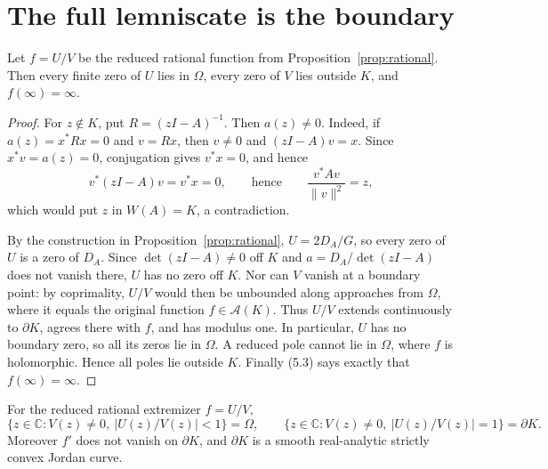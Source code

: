 \documentclass[preprints,article,submit,oneauthor]{Definitions/mdpi}
\numberwithin{equation}{section}
\newcommand{\C}{\mathbb C}
\begin{document}
\section{The full lemniscate is the boundary}

\begin{Lemma}\label{lem:zeros}
Let \(f=U/V\) be the reduced rational function from
Proposition~\ref{prop:rational}.  Then every finite zero of \(U\) lies in
\(\Omega\), every zero of \(V\) lies outside \(K\), and \(f(\infty)=\infty\).
\end{Lemma}

\begin{proof}
For \(z\notin K\), put \(R=(zI-A)^{-1}\).  Then \(a(z)\neq0\).
Indeed, if \(a(z)=x^*Rx=0\) and \(v=Rx\), then \(v\neq0\) and
\((zI-A)v=x\).  Since \(x^*v=a(z)=0\), conjugation gives \(v^*x=0\), and hence
\[
 v^*(zI-A)v=v^*x=0,
 \qquad\text{hence}\qquad
 \frac{v^*Av}{\|v\|^2}=z,
\]
which would put \(z\) in \(W(A)=K\), a contradiction.

By the construction in Proposition~\ref{prop:rational}, \(U=2D_A/G\), so every
zero of \(U\) is a zero of \(D_A\).  Since \(\det(zI-A)\neq0\) off \(K\) and
\(a=D_A/\det(zI-A)\) does not vanish there, \(U\) has no zero off \(K\).  Nor
can \(V\) vanish at a boundary point: by
coprimality, \(U/V\) would then be unbounded along approaches from \(\Omega\),
where it equals the original function \(f\in\mathcal A(K)\).  Thus \(U/V\)
extends continuously to \(\partial K\), agrees there with \(f\), and has
modulus one.  In particular, \(U\) has no boundary zero, so all its zeros lie
in \(\Omega\).  A reduced pole cannot lie in \(\Omega\), where \(f\) is
holomorphic.  Hence all poles lie outside \(K\).
Finally (5.3) says exactly that \(f(\infty)=\infty\).
\end{proof}

\begin{Proposition}\label{prop:full-level}
For the reduced rational extremizer \(f=U/V\),
\[
 \{z\in\C:V(z)\neq0,\ |U(z)/V(z)|<1\}=\Omega,
 \qquad
 \{z\in\C:V(z)\neq0,\ |U(z)/V(z)|=1\}=\partial K.   \tag{6.1}
\]
Moreover \(f'\) does not vanish on \(\partial K\), and \(\partial K\) is a
smooth real-analytic strictly convex Jordan curve.
\end{Proposition}
\end{document}
